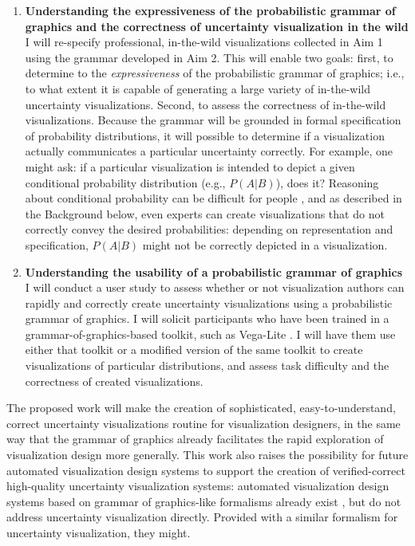 \documentclass[11pt]{article}
\begin{document}
\begin{enumerate}[noitemsep]
  \item \textbf{Understanding the expressiveness of the probabilistic grammar of graphics and the correctness of uncertainty visualization in the wild}
    I will re-specify professional, in-the-wild visualizations collected in Aim 1 using the grammar developed in Aim 2. This will enable two goals: first, to determine to the \emph{expressiveness} of the probabilistic grammar of graphics; i.e., to what extent it is capable of generating a large variety of in-the-wild uncertainty visualizations. Second, to assess the correctness of in-the-wild visualizations. Because the grammar will be grounded in formal specification of probability distributions, it will possible to determine if a visualization actually communicates a particular uncertainty correctly. For example, one might ask: if a particular visualization is intended to depict a given conditional probability distribution (e.g., $P(A|B)$), does it? Reasoning about conditional probability can be difficult for people \cite{Gigerenzer1995}, and as described in the Background below, even experts can create visualizations that do not correctly convey the desired probabilities: depending on representation and specification, $P(A|B)$ might not be correctly depicted in a visualization. 
  \item \textbf{Understanding the usability of a probabilistic grammar of graphics}
    I will conduct a user study to assess whether or not visualization authors can rapidly and correctly create uncertainty visualizations using a probabilistic grammar of graphics. I will solicit participants who have been trained in a grammar-of-graphics-based toolkit, such as Vega-Lite \cite{Satyanarayan2017vegalite}. I will have them use either that toolkit or a modified version of the same toolkit to create visualizations of particular distributions, and assess task difficulty and the correctness of created visualizations.
\end{enumerate}

The proposed work will make the creation of sophisticated, easy-to-understand, correct uncertainty visualizations routine for visualization designers, in the same way that the grammar of graphics already facilitates the rapid exploration of visualization design more generally. This work also raises the possibility for future automated visualization design systems to support the creation of verified-correct high-quality uncertainty visualization systems: automated visualization design systems based on grammar of graphics-like formalisms already exist \cite{mackinlay1986automating, moritz2018formalizing}, but do not address uncertainty visualization directly. Provided with a similar formalism for uncertainty visualization, they might.
\end{document}
